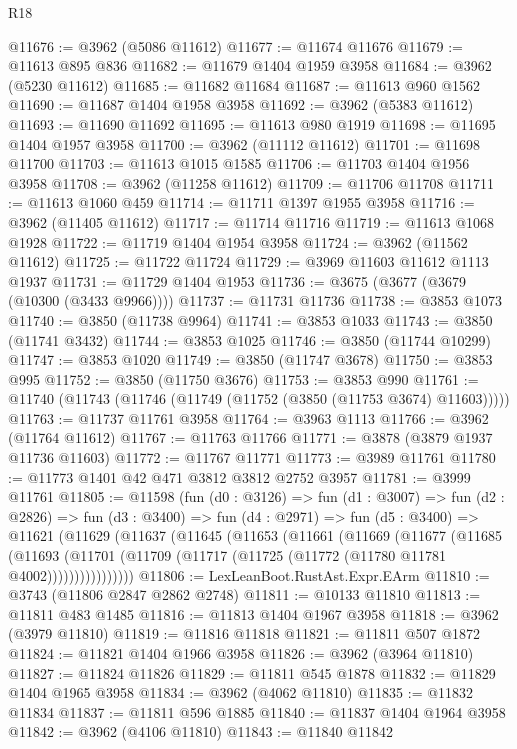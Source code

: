 \begin{lexlean}{R18}
\begin{coremodule}
@11676 := @3962 (@5086 @11612)
@11677 := @11674 @11676
@11679 := @11613 @895 @836
@11682 := @11679 @1404 @1959 @3958
@11684 := @3962 (@5230 @11612)
@11685 := @11682 @11684
@11687 := @11613 @960 @1562
@11690 := @11687 @1404 @1958 @3958
@11692 := @3962 (@5383 @11612)
@11693 := @11690 @11692
@11695 := @11613 @980 @1919
@11698 := @11695 @1404 @1957 @3958
@11700 := @3962 (@11112 @11612)
@11701 := @11698 @11700
@11703 := @11613 @1015 @1585
@11706 := @11703 @1404 @1956 @3958
@11708 := @3962 (@11258 @11612)
@11709 := @11706 @11708
@11711 := @11613 @1060 @459
@11714 := @11711 @1397 @1955 @3958
@11716 := @3962 (@11405 @11612)
@11717 := @11714 @11716
@11719 := @11613 @1068 @1928
@11722 := @11719 @1404 @1954 @3958
@11724 := @3962 (@11562 @11612)
@11725 := @11722 @11724
@11729 := @3969 @11603 @11612 @1113 @1937
@11731 := @11729 @1404 @1953
@11736 := @3675 (@3677 (@3679 (@10300 (@3433 @9966))))
@11737 := @11731 @11736
@11738 := @3853 @1073
@11740 := @3850 (@11738 @9964)
@11741 := @3853 @1033
@11743 := @3850 (@11741 @3432)
@11744 := @3853 @1025
@11746 := @3850 (@11744 @10299)
@11747 := @3853 @1020
@11749 := @3850 (@11747 @3678)
@11750 := @3853 @995
@11752 := @3850 (@11750 @3676)
@11753 := @3853 @990
@11761 := @11740 (@11743 (@11746 (@11749 (@11752 (@3850 (@11753 @3674) @11603)))))
@11763 := @11737 @11761 @3958
@11764 := @3963 @1113
@11766 := @3962 (@11764 @11612)
@11767 := @11763 @11766
@11771 := @3878 (@3879 @1937 @11736 @11603)
@11772 := @11767 @11771
@11773 := @3989 @11761
@11780 := @11773 @1401 @42 @471 @3812 @3812 @2752 @3957
@11781 := @3999 @11761
@11805 := @11598
    (fun (d0 : @3126) =>
    fun (d1 : @3007) =>
    fun (d2 : @2826) =>
    fun (d3 : @3400) =>
    fun (d4 : @2971) =>
    fun (d5 : @3400) =>
    @11621
      (@11629
        (@11637
          (@11645
            (@11653
              (@11661
                (@11669
                  (@11677
                    (@11685
                      (@11693
                        (@11701 (@11709 (@11717 (@11725 (@11772 (@11780 @11781 @4002))))))))))))))))
@11806 := LexLeanBoot.RustAst.Expr.EArm
@11810 := @3743 (@11806 @2847 @2862 @2748)
@11811 := @10133 @11810
@11813 := @11811 @483 @1485
@11816 := @11813 @1404 @1967 @3958
@11818 := @3962 (@3979 @11810)
@11819 := @11816 @11818
@11821 := @11811 @507 @1872
@11824 := @11821 @1404 @1966 @3958
@11826 := @3962 (@3964 @11810)
@11827 := @11824 @11826
@11829 := @11811 @545 @1878
@11832 := @11829 @1404 @1965 @3958
@11834 := @3962 (@4062 @11810)
@11835 := @11832 @11834
@11837 := @11811 @596 @1885
@11840 := @11837 @1404 @1964 @3958
@11842 := @3962 (@4106 @11810)
@11843 := @11840 @11842

\end{coremodule}
\end{lexlean}
